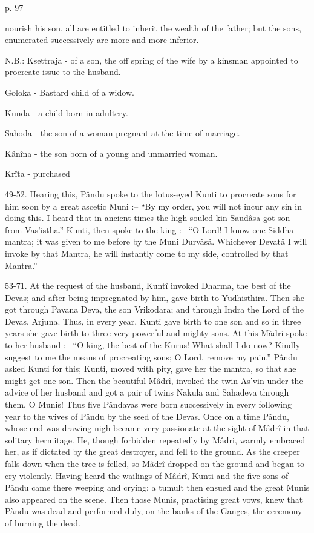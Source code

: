  

p. 97

 

nourish his son, all are entitled to inherit the wealth of the father; but the sons, enumerated successively are more and more inferior.

 

N.B.: Ksettraja - of a son, the off spring of the wife by a kinsman appointed to procreate issue to the husband.

         Goloka - Bastard child of a widow.

         Kunda - a child born in adultery.

         Sahoda - the son of a woman pregnant at the time of marriage.

         Kânîna - the son born of a young and unmarried woman.

         Krîta - purchased

 

49-52. Hearing this, Pându spoke to the lotus-eyed Kunti to procreate sons for him soon by a great ascetic Muni :-- “By my order, you will not incur any sin in doing this. I heard that in ancient times the high souled kin Saudâsa got son from Vas'istha.” Kunti, then spoke to the king :-- “O Lord! I know one Siddha mantra; it was given to me before by the Muni Durvâsâ. Whichever Devatâ I will invoke by that Mantra, he will instantly come to my side, controlled by that Mantra.”

 

53-71. At the request of the husband, Kuntî invoked Dharma, the best of the Devas; and after being impregnated by him, gave birth to Yudhisthira. Then she got through Pavana Deva, the son Vrikodara; and through Indra the Lord of the Devas, Arjuna. Thus, in every year, Kunti gave birth to one son and so in three years she gave birth to three very powerful and mighty sons. At this Màdri spoke to her husband :-- “O king, the best of the Kurus! What shall I do now? Kindly suggest to me the means of procreating sons; O Lord, remove my pain.” Pându asked Kunti for this; Kunti, moved with pity, gave her the mantra, so that she might get one son. Then the beautiful Mâdrî, invoked the twin As'vin under the advice of her husband and got a pair of twins Nakula and Sahadeva through them. O Munis! Thus five Pândavas were born successively in every following year to the wives of Pându by the seed of the Devas. Once on a time Pându, whose end was drawing nigh became very passionate at the sight of Mâdrî in that solitary hermitage. He, though forbidden repeatedly by Mâdri, warmly embraced her, as if dictated by the great destroyer, and fell to the ground. As the creeper falls down when the tree is felled, so Mâdrî dropped on the ground and began to cry violently. Having heard the wailings of Mâdrî, Kunti and the five sons of Pându came there weeping and crying; a tumult then ensued and the great Munis also appeared on the scene. Then those Munis, practising great vows, knew that Pàndu was dead and performed duly, on the banks of the Ganges, the ceremony of burning the dead.

